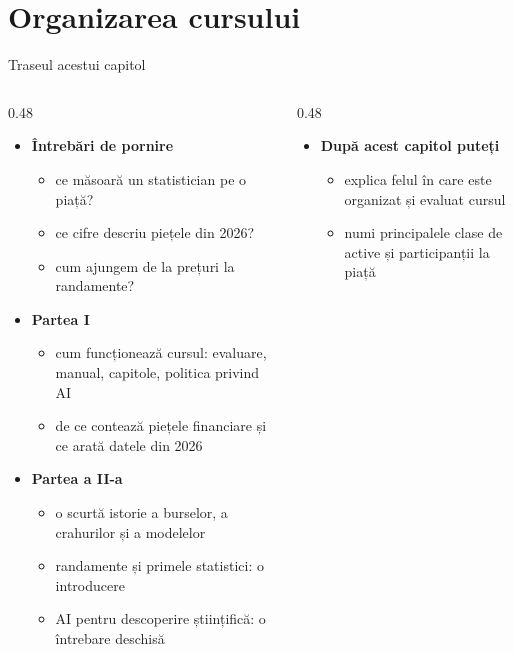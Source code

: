 \section{Organizarea cursului}

\begin{frame}{Traseul acestui capitol}
\itemsize{\small}
\begin{columns}[T]
\begin{column}{0.48\textwidth}
\begin{itemize}
    \item \textbf{Întrebări de pornire}
    \begin{itemize}
        \item ce măsoară un statistician pe o piață?
        \item ce cifre descriu piețele din 2026?
        \item cum ajungem de la prețuri la randamente?
    \end{itemize}
    \item \textbf{Partea I}
    \begin{itemize}
        \item cum funcționează cursul: evaluare, manual, capitole, politica privind AI
        \item de ce contează piețele financiare și ce arată datele din 2026
    \end{itemize}
    \item \textbf{Partea a II-a}
    \begin{itemize}
        \item o scurtă istorie a burselor, a crahurilor și a modelelor
        \item randamente și primele statistici: o introducere
        \item AI pentru descoperire științifică: o întrebare deschisă
    \end{itemize}
\end{itemize}
\end{column}
\begin{column}{0.48\textwidth}
\begin{itemize}
    \item \textbf{După acest capitol puteți}
    \begin{itemize}
        \item explica felul în care este organizat și evaluat cursul
        \item numi principalele clase de active și participanții la piață

\end{itemize}
\end{itemize}
\end{column}
\end{columns}
\end{frame}
